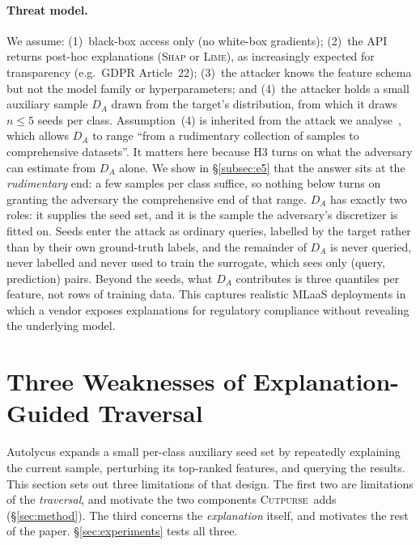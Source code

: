 \documentclass[sigconf,anonymous,review]{acmart}
\newcommand{\sys}{\textsc{Cutpurse}}
\begin{document}
\paragraph{Threat model.}
We assume: (1)~black-box access only (no white-box gradients); (2)~the API returns
post-hoc explanations (\textsc{Shap} or \textsc{Lime}), as increasingly expected for
transparency (e.g.\ GDPR Article~22); (3)~the attacker knows the feature schema but
not the model family or hyperparameters; and (4)~the attacker holds a small auxiliary
sample $D_A$ drawn from the target's distribution, from which it draws $n{\le}5$ seeds per
class. Assumption~(4) is inherited from the attack we analyse~\cite{oksuz2024autolycus},
which allows $D_A$ to range ``from a rudimentary collection of samples to comprehensive datasets''. It matters here because H3 turns on what the adversary can estimate from $D_A$
alone. We show in \S\ref{subsec:e5} that the answer sits at the \emph{rudimentary} end: a few samples
per class suffice, so nothing below turns on granting the adversary the comprehensive end of that
range. $D_A$ has exactly two roles: it supplies the seed set, and it is the sample the adversary's
discretizer is fitted on. Seeds enter the attack as ordinary queries, labelled by the target rather
than by their own ground-truth labels, and the remainder of $D_A$ is never queried, never labelled and
never used to train the surrogate, which sees only (query, prediction) pairs. Beyond the seeds, what
$D_A$ contributes is three quantiles per feature, not rows of training data. This captures realistic MLaaS deployments in which a vendor exposes explanations for
regulatory compliance without revealing the underlying model.

\section{Three Weaknesses of Explanation-Guided Traversal}
\label{sec:analysis}
Autolycus expands a small per-class auxiliary seed set by repeatedly explaining the current sample,
perturbing its top-ranked features, and querying the results. This section sets out three limitations
of that design. The first two are limitations of the \emph{traversal}, and motivate the two components
\sys\ adds (\S\ref{sec:method}). The third concerns the \emph{explanation} itself, and motivates the
rest of the paper. \S\ref{sec:experiments} tests all three.
\end{document}
